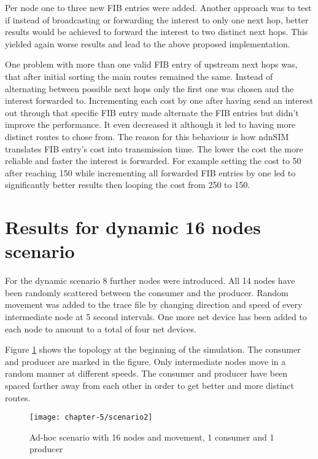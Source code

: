 \vspace{5mm} %

Per node one to three new FIB entries were added. Another approach was to test if instead of broadcasting or forwarding the interest to only one next hop, better results would be achieved to forward the interest to two distinct next hops. This yielded again worse results and lead to the above proposed implementation.

\vspace{5mm} %

One problem with more than one valid FIB entry of upstream next hops was, that after initial sorting the main routes remained the same. Instead of alternating between possible next hops only the first one was chosen and the interest forwarded to. Incrementing each cost by one after having send an interest out through that specific FIB entry made alternate the FIB entries but didn't improve the performance. It even decreased it although it led to having more distinct routes to chose from. The reason for this behaviour is how ndnSIM translates FIB entry's cost into transmission time. The lower the cost the more reliable and faster the interest is forwarded. For example setting the cost to 50 after reaching 150 while incrementing all forwarded FIB entries by one led to significantly better results then looping the cost from 250 to 150. 

\section{Results for dynamic 16 nodes scenario}

For the dynamic scenario 8 further nodes were introduced. All 14 nodes have been randomly scattered between the consumer and the producer. Random movement was added to the trace file by changing direction and speed of every intermediate node at 5 second intervals. One more net device has been added to each node to amount to a total of four net devices. 

Figure \ref{fig:scenario2} shows the topology at the beginning of the simulation. The consumer and producer are marked in the figure. Only intermediate nodes move in a random manner at different speeds. The consumer and producer have been spaced farther away from each other in order to get better and more distinct routes.

\begin{figure}[H]
  \centering
  \texttt{[image: chapter-5/scenario2]}
  \caption{Ad-hoc scenario with 16 nodes and movement, 1 consumer and 1 producer}
  \label{fig:scenario2}
\end{figure}

